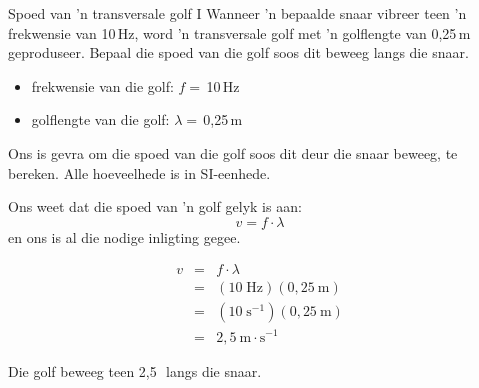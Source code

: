 \begin{wex}{Spoed van 'n transversale golf I }{Wanneer 'n bepaalde snaar vibreer teen 'n frekwensie van 10\,Hz, word 'n transversale golf met  'n 
      golflengte van 0,25\,m geproduseer. Bepaal die spoed van die golf soos dit beweeg langs
      die snaar.}
{
\begin{itemize}
\item{frekwensie van die golf: $f=$\,10\,Hz}
\item{golflengte van die golf: $\lambda=$\,0,25\,m}
\end{itemize}
Ons is gevra om die spoed van die golf soos dit deur die snaar beweeg, te bereken. Alle
      hoeveelhede is in SI-eenhede.

Ons weet dat die spoed van 'n golf gelyk is aan:
\begin{equation*}
v=f\cdot \lambda 
\end{equation*}
en ons is al die nodige inligting gegee.

\begin{eqnarray*}
v&=&f\cdot \lambda\\
&=&(10\;\text{Hz})(0,25~\text{m})\\
&=&(10\;\text{s}^{-1})(0,25~\text{m})\\
&=&2,5~\text{m} \cdot \text{s}^{-1}
\end{eqnarray*}

Die golf beweeg teen 2,5\,\ms\ langs die snaar.
}
\end{wex}


